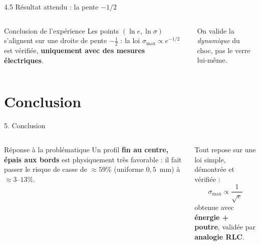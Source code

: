 \documentclass[11pt,aspectratio=169]{beamer}
\begin{document}
\begin{frame}{4.5 Résultat attendu : la pente $-1/2$}
  \begin{columns}[c]
    \centering
    \footnotesize
    \begin{block}{Conclusion de l'expérience}
    Les points $(\ln e,\ln\sigma)$ s'alignent sur une droite de pente
    $\boxed{-\tfrac12}$ : la loi $\sigma_{\max}\propto e^{-1/2}$ est vérifiée,
    \textbf{uniquement avec des mesures électriques}.
    \end{block}
    \scriptsize On valide la \emph{dynamique} du choc, pas le verre lui-même.
  \end{columns}
\end{frame}

\section{Conclusion}
\begin{frame}{5. Conclusion}
  \begin{columns}[c]
    \footnotesize
    \begin{block}{Réponse à la problématique}
    Un profil \textbf{fin au centre, épais aux bords} est physiquement très
    favorable : il fait passer le risque de casse de
    \textcolor{danger}{$\approx 59\%$} (uniforme $0{,}5$~mm) à
    \textcolor{ok}{$\approx 3$--$13\%$}.
    \end{block}
    Tout repose sur une loi simple, démontrée et vérifiée :
    \[ \sigma_{\max}\propto \frac{1}{\sqrt{e}} \]
    obtenue avec \textbf{énergie + poutre}, validée par \textbf{analogie RLC}.
    \centering
  \end{columns}
\end{frame}
\end{document}
